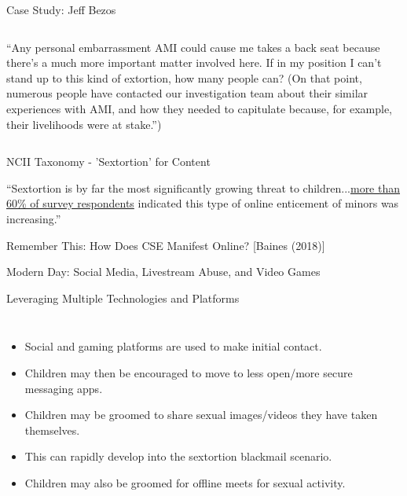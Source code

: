 \documentclass[nobackground,dvipsnames,table,aspectratio=169]{beamer}
\begin{document}
\begin{frame}{Case Study: Jeff Bezos}
    \begin{columns}
            “Any personal embarrassment AMI could cause me takes a back seat because there’s a much more important matter involved here. If in my position I can’t stand up to this kind of extortion, how many people can? (On that point, numerous people have contacted our investigation team about their similar experiences with AMI, and how they needed to capitulate because, for example, their livelihoods were at stake.”)
    \end{columns}
\end{frame}

\begin{frame}{NCII Taxonomy - 'Sextortion' for Content}
\end{frame}

\begin{frame}{}
    “Sextortion is by far the most significantly growing threat to children...\href{https://www.justice.gov/psc/file/842411/download}{more than 60\% of survey respondents} indicated this type of online enticement of minors was increasing.”
\end{frame}

\begin{frame}{Remember This: How Does CSE Manifest Online?}
    [Baines (2018)]
\end{frame}

\begin{frame}{Modern Day: Social Media, Livestream Abuse, and Video Games}
\end{frame}

\begin{frame}{Leveraging Multiple Technologies and Platforms }
    \begin{columns}
            \begin{itemize}
                \item Social and gaming platforms are used to make initial contact.
                \item Children may then be encouraged to move to less open/more secure messaging apps.
                \item Children may be groomed to share sexual images/videos they have taken themselves.
                \item This can rapidly develop into the sextortion blackmail scenario.
                \item Children may also be groomed for offline meets for sexual activity.
            \end{itemize}
    \end{columns}
\end{frame}
\end{document}
